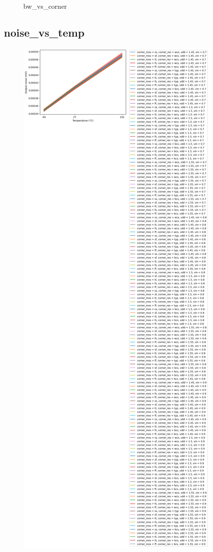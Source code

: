 \documentclass[
  a4paper,
  DIV=11,
  numbers=noendperiod]{scrartcl}
\begin{document}
\begin{tcolorbox}
\begin{figure}[H]
{}

\caption{bw\_vs\_corner}

\end{figure}%

\subsection*{noise\_vs\_temp}\label{noise_vs_temp-1}

\begin{figure}[H]

{\centering \includegraphics{./cace/_docs/ota-improved/schematic/noise_vs_temp.png}

}
\end{figure}
\end{tcolorbox}
\end{document}
